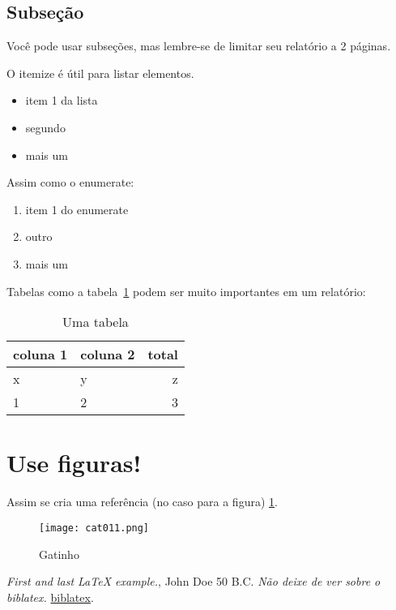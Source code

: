 \documentclass[10pt,a4paper,twocolumn]{article} %
\begin{document}
\subsection{Subseção}

Você pode usar subseções, mas lembre-se de limitar seu relatório a 2 páginas.

O itemize é útil para listar elementos.

\begin{itemize}
	\item item 1 da lista
	\item segundo 
	\item mais um
\end{itemize}

Assim como o enumerate:
\begin{enumerate}
	\item item 1 do enumerate
	\item outro
	\item mais um
\end{enumerate}

Tabelas como a tabela~\ref{tab:Tabela1} podem ser muito importantes em um relatório:

\begin{table}[hbt]
	\centering
    \begin{tabular}{ll|r}\hline
        coluna 1 & coluna 2 & total \\\hline
        x & y & z\\
        1 & 2 & 3\\
    \end{tabular}
	\caption{Uma tabela}
    \label{tab:Tabela1}
\end{table}


\section{Use figuras!}

Assim se cria uma referência (no caso para a figura) \ref{fig:gato}.

\begin{figure}
	\texttt{[image: cat011.png]} %
	\caption{Gatinho} %
	\label{fig:gato} %
\end{figure}



\begin{thebibliography}{9}
     \emph{First and last \LaTeX{} example.},
    John Doe 50 B.C. 
     \emph{Não deixe de ver sobre o biblatex.} \href{https://www.ctan.org/pkg/}{biblatex}. 
\end{thebibliography}
    
\end{document}
